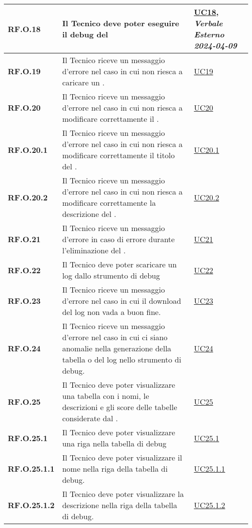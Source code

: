 \begin{longtable}{|P{3cm}|P{6,5cm}|>{\arraybackslash}P{4cm}|}
    \hline
    \textbf{RF.O.18} & Il Tecnico deve poter eseguire il debug del  &  \hyperref[UC18]{UC18}, \emph{Verbale Esterno 2024-04-09}\\
    \hline
    \textbf{RF.O.19} & Il Tecnico riceve un messaggio d'errore nel caso in cui non riesca a caricare un . & \hyperref[UC19]{UC19} \\
    \hline 
    \textbf{RF.O.20} & Il Tecnico riceve un messaggio d'errore nel caso in cui non riesca a modificare correttamente il . & \hyperref[UC20]{UC20} \\
    \hline
    \textbf{RF.O.20.1} & Il Tecnico riceve un messaggio d'errore nel caso in cui non riesca a modificare correttamente il titolo del . & \hyperref[UC20point1]{UC20.1} \\
    \hline
    \textbf{RF.O.20.2} & Il Tecnico riceve un messaggio d'errore nel caso in cui non riesca a modificare correttamente la descrizione del . & \hyperref[UC20point2]{UC20.2} \\
    \hline
    \textbf{RF.O.21} & Il Tecnico riceve un messaggio d'errore in caso di errore durante l'eliminazione del . &  \hyperref[21]{UC21}\\
    \hline
    \textbf{RF.O.22} & Il Tecnico deve poter scaricare un log dallo strumento di debug &  \hyperref[UC22]{UC22}\\
    \hline
    \textbf{RF.O.23} & Il Tecnico riceve un messaggio d'errore nel caso in cui il download del log non vada a buon fine. &  \hyperref[UC23]{UC23}\\
    \hline
    \textbf{RF.O.24} & Il Tecnico riceve un messaggio d'errore nel caso in cui ci siano anomalie nella generazione della tabella o del log nello strumento di debug. &  \hyperref[UC24]{UC24}\\
    \hline
    \textbf{RF.O.25} & Il Tecnico deve poter visualizzare una tabella con i nomi, le descrizioni e gli score delle tabelle considerate dal . &  \hyperref[UC25]{UC25}\\
    \hline
    \textbf{RF.O.25.1} & Il Tecnico deve poter visualizzare una riga nella tabella di debug &  \hyperref[UC25point1]{UC25.1}\\
    \hline
    \textbf{RF.O.25.1.1} & Il Tecnico deve poter visualizzare il nome nella riga della tabella di debug. &  \hyperref[UC25poin1point1]{UC25.1.1}\\
    \hline
    \textbf{RF.O.25.1.2} & Il Tecnico deve poter visualizzare la descrizione nella riga della tabella di debug. &  \hyperref[UC25poin1point2]{UC25.1.2}\\

\end{longtable}
